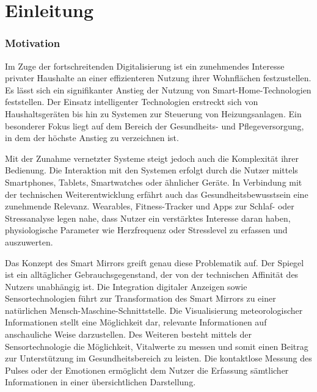 
\chapter{Einleitung}
\subsection*{Motivation}

Im Zuge der fortschreitenden Digitalisierung ist ein zunehmendes Interesse privater Haushalte an einer effizienteren Nutzung ihrer Wohnflächen festzustellen. Es lässt sich ein signifikanter Anstieg der Nutzung von Smart-Home-Technologien feststellen. Der Einsatz intelligenter Technologien erstreckt sich von Haushaltsgeräten bis hin zu Systemen zur Steuerung von Heizungsanlagen. Ein besonderer Fokus liegt auf dem Bereich der Gesundheits- und Pflegeversorgung, in dem der höchste Anstieg zu verzeichnen ist.

Mit der Zunahme vernetzter Systeme steigt jedoch auch die Komplexität ihrer Bedienung.  
Die Interaktion mit den Systemen erfolgt durch die Nutzer mittels  Smartphones, Tablets, Smartwatches oder ähnlicher Geräte.
In Verbindung mit der technischen Weiterentwicklung erfährt auch das Gesundheitsbewusstsein eine zunehmende Relevanz. Wearables, Fitness-Tracker und Apps zur Schlaf- oder Stressanalyse legen nahe, dass Nutzer ein verstärktes Interesse daran haben, physiologische Parameter wie Herzfrequenz oder Stresslevel zu erfassen und auszuwerten. 

Das Konzept des Smart Mirrors greift genau diese Problematik auf. Der Spiegel ist ein alltäglicher Gebrauchsgegenstand, der von der technischen Affinität des Nutzers unabhängig ist. Die Integration digitaler Anzeigen sowie Sensortechnologien führt zur Transformation des Smart Mirrors zu einer natürlichen Mensch-Maschine-Schnittstelle. Die Visualisierung meteorologischer Informationen stellt eine Möglichkeit dar, relevante Informationen auf anschauliche Weise darzustellen. Des Weiteren besteht mittels der Sensortechnologie die Möglichkeit, Vitalwerte zu messen und somit einen Beitrag zur Unterstützung im Gesundheitsbereich zu leisten. Die kontaktlose Messung des Pulses oder der Emotionen ermöglicht dem Nutzer die Erfassung sämtlicher Informationen in einer übersichtlichen Darstellung.

